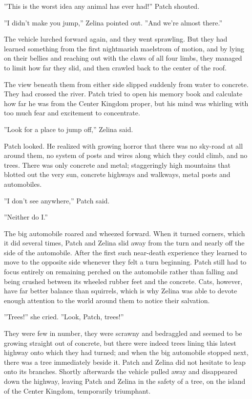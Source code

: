 \documentclass[12pt]{book}
\begin{document}
''This is the worst idea any animal has ever had!'' Patch shouted.

''I didn't make you jump,'' Zelina pointed out. ''And we're almost there.''

The vehicle lurched forward again, and they went sprawling. But they had learned something from the first nightmarish maelstrom of motion, and by lying on their bellies and reaching out with the claws of all four limbs, they managed to limit how far they slid, and then crawled back to the center of the roof.

The view beneath them from either side slipped suddenly from water to concrete. They had crossed the river. Patch tried to open his memory book and calculate how far he was from the Center Kingdom proper, but his mind was whirling with too much fear and excitement to concentrate.

''Look for a place to jump off,'' Zelina said.

Patch looked. He realized with growing horror that there was no sky-road at all around them, no system of posts and wires along which they could climb, and no trees. There was only concrete and metal; staggeringly high mountains that blotted out the very sun, concrete highways and walkways, metal posts and automobiles.

''I don't see anywhere,'' Patch said.

''Neither do I.''

The big automobile roared and wheezed forward. When it turned corners, which it did several times, Patch and Zelina slid away from the turn and nearly off the side of the automobile. After the first such near-death experience they learned to move to the opposite side whenever they felt a turn beginning. Patch still had to focus entirely on remaining perched on the automobile rather than falling and being crushed between its wheeled rubber feet and the concrete. Cats, however, have far better balance than squirrels, which is why Zelina was able to devote enough attention to the world around them to notice their salvation.

''Trees!'' she cried. ''Look, Patch, trees!''

They were few in number, they were scrawny and bedraggled and seemed to be growing straight out of concrete, but there were indeed trees lining this latest highway onto which they had turned; and when the big automobile stopped next, there was a tree immediately beside it. Patch and Zelina did not hesitate to leap onto its branches. Shortly afterwards the vehicle pulled away and disappeared down the highway, leaving Patch and Zelina in the safety of a tree, on the island of the Center Kingdom, temporarily triumphant.
\end{document}
